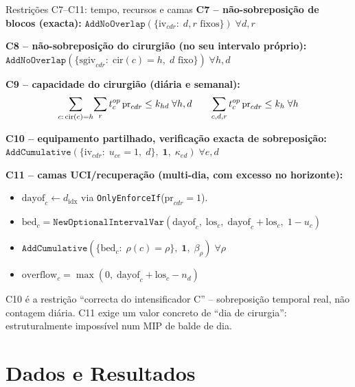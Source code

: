 \documentclass[10pt,aspectratio=169]{beamer}
\begin{document}
\begin{frame}{Restri\c{c}\~oes C7--C11: tempo, recursos e camas}
  \textbf{C7 -- n\~ao-sobreposi\c{c}\~ao de blocos (exacta):}\quad
  $\texttt{AddNoOverlap}(\{\text{iv}_{cdr}:\;d,r\text{ fixos}\})\;\forall d,r$

  \smallskip
  \textbf{C8 -- n\~ao-sobreposi\c{c}\~ao do cirurgi\~ao (no seu intervalo pr\'oprio):}
  \quad$\texttt{AddNoOverlap}(\{\text{sgiv}_{cdr}:\;\text{cir}(c)=h,\;d\text{ fixo}\})\;\forall h,d$

  \smallskip
  \textbf{C9 -- capacidade do cirurgi\~ao (di\'aria e semanal):}
  \[\small
    \sum_{c:\,\text{cir}(c)=h}\!\sum_r t_c^{op}\,\text{pr}_{cdr}\le k_{hd}\;\forall h,d
    \qquad
    \sum_{c,d,r} t_c^{op}\,\text{pr}_{cdr}\le k_h\;\forall h
  \]

  \textbf{C10 -- equipamento partilhado, verifica\c{c}\~ao exacta de sobreposi\c{c}\~ao:}
  \quad$\texttt{AddCumulative}(\{\text{iv}_{cdr}:\;u_{ce}=1,\;d\},\;\mathbf{1},\;\kappa_{ed})\;\forall e,d$

  \textbf{C11 -- camas UCI/recupera\c{c}\~ao (multi-dia, com excesso no horizonte):}
  \begin{itemize}\footnotesize
    \item $\text{dayof}_c\leftarrow d_\text{idx}$
      via \texttt{OnlyEnforceIf}($\text{pr}_{cdr}=1$).
    \item $\text{bed}_c=\texttt{NewOptionalIntervalVar}
      (\text{dayof}_c,\;\text{los}_c,\;\text{dayof}_c+\text{los}_c,\;1-u_c)$
    \item $\texttt{AddCumulative}(\{\text{bed}_c:\;\rho(c)=\rho\},\;\mathbf{1},\;\beta_\rho)
      \;\forall\rho$
    \item $\text{overflow}_c=\max(0,\;\text{dayof}_c+\text{los}_c-n_d)$
  \end{itemize}
  \footnotesize C10 \'e a restri\c{c}\~ao ``correcta do intensificador C''
  -- sobreposi\c{c}\~ao temporal real, n\~ao contagem di\'aria.
  C11 exige um valor concreto de ``dia de cirurgia'':
  estruturalmente imposs\'ivel num MIP de balde de dia.
\end{frame}

\section{Dados e Resultados}
\end{document}

